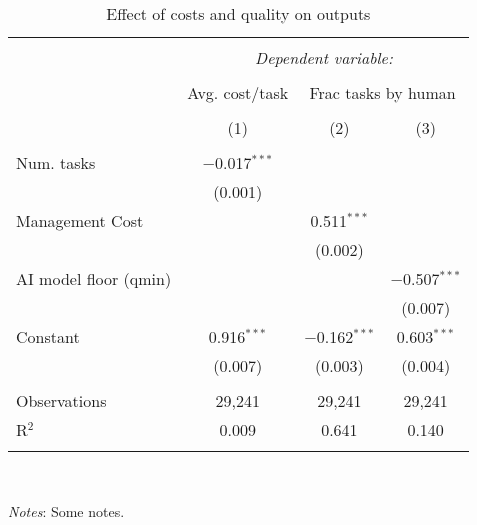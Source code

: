 
\begin{table}[!htbp] \centering 
  \caption{Effect of costs and quality on outputs} 
  \label{tab:outcomes} 
\footnotesize 
\begin{tabular}{@{\extracolsep{-6pt}}lccc} 
\\[-1.8ex]\hline 
\hline \\[-1.8ex] 
 & \multicolumn{3}{c}{\textit{Dependent variable:}} \\ 
\cline{2-4} 
\\[-1.8ex] & Avg. cost/task & \multicolumn{2}{c}{Frac tasks by human} \\ 
\\[-1.8ex] & (1) & (2) & (3)\\ 
\hline \\[-1.8ex] 
 Num. tasks & $-$0.017$^{***}$ &  &  \\ 
  & (0.001) &  &  \\ 
  Management Cost &  & 0.511$^{***}$ &  \\ 
  &  & (0.002) &  \\ 
  AI model floor (qmin) &  &  & $-$0.507$^{***}$ \\ 
  &  &  & (0.007) \\ 
  Constant & 0.916$^{***}$ & $-$0.162$^{***}$ & 0.603$^{***}$ \\ 
  & (0.007) & (0.003) & (0.004) \\ 
 \hline \\[-1.8ex] 
Observations & 29,241 & 29,241 & 29,241 \\ 
R$^{2}$ & 0.009 & 0.641 & 0.140 \\ 
\hline 
\hline \\[-1.8ex] 
\end{tabular}
\\
\begin{minipage}{ \textwidth}
{\footnotesize \emph{Notes}: Some notes.}
\end{minipage}
\end{table}
